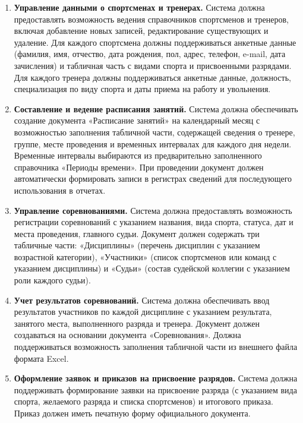 \begin{enumerate}
	\item \textbf{Управление данными о спортсменах и тренерах.} Система должна предоставлять возможность ведения справочников спортсменов и тренеров, включая добавление новых записей, редактирование существующих и удаление. Для каждого спортсмена должны поддерживаться анкетные данные (фамилия, имя, отчество, дата рождения, пол, адрес, телефон, e-mail, дата зачисления) и табличная часть с видами спорта и присвоенными разрядами. Для каждого тренера должны поддерживаться анкетные данные, должность, специализация по виду спорта и даты приема на работу и увольнения.
	
	\item \textbf{Составление и ведение расписания занятий.} Система должна обеспечивать создание документа «Расписание занятий» на календарный месяц с возможностью заполнения табличной части, содержащей сведения о тренере, группе, месте проведения и временных интервалах для каждого дня недели. Временные интервалы выбираются из предварительно заполненного справочника «Периоды времени». При проведении документ должен автоматически формировать записи в регистрах сведений для последующего использования в отчетах.
	
	\item \textbf{Управление соревнованиями.} Система должна предоставлять возможность регистрации соревнований с указанием названия, вида спорта, статуса, дат и места проведения, главного судьи. Документ должен содержать три табличные части: «Дисциплины» (перечень дисциплин с указанием возрастной категории), «Участники» (список спортсменов или команд с указанием дисциплины) и «Судьи» (состав судейской коллегии с указанием роли каждого судьи).
	
	\item \textbf{Учет результатов соревнований.} Система должна обеспечивать ввод результатов участников по каждой дисциплине с указанием результата, занятого места, выполненного разряда и тренера. Документ должен создаваться на основании документа «Соревнования». Должна поддерживаться возможность заполнения табличной части из внешнего файла формата Excel.
	
	\item \textbf{Оформление заявок и приказов на присвоение разрядов.} Система должна поддерживать формирование заявки на присвоение разряда (с указанием вида спорта, желаемого разряда и списка спортсменов) и итогового приказа. Приказ должен иметь печатную форму официального документа.
	

\end{enumerate}
